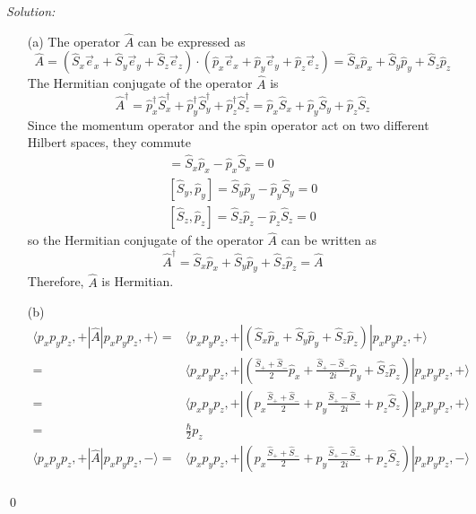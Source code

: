 \documentclass[10pt,a4paper]{article}
\newenvironment{sol}
    {\emph{Solution:}
    }
    {
    \qed
    }
\begin{document}
\begin{sol}
\begin{itemize}
\item[(a)] The operator $\hat{A}$ can be expressed as
\begin{equation}
\hat{A}=(\hat{S}_x\vec{e}_x+\hat{S}_y\vec{e}_y+\hat{S}_z\vec{e}_z)\cdot(\hat{p}_x\vec{e}_x+\hat{p}_y\vec{e}_y+\hat{p}_z\vec{e}_z)=\hat{S}_x\hat{p}_x+\hat{S}_y\hat{p}_y+\hat{S}_z\hat{p}_z
\end{equation}
The Hermitian conjugate of the operator $\hat{A}$ is
\begin{equation}
\hat{A}^{\dagger}=\hat{p}_x^{\dagger}\hat{S}_x^{\dagger}+\hat{p}_y^{\dagger}\hat{S}_y^{\dagger}+\hat{p}_z^{\dagger}\hat{S}_z^{\dagger}=\hat{p}_x\hat{S}_x+\hat{p}_y\hat{S}_y+\hat{p}_z\hat{S}_z
\end{equation}
Since the momentum operator and the spin operator act on two different Hilbert spaces, they commute
\begin{gather}
[\hat{S}_x,\hat{p}_x]=\hat{S}_x\hat{p}_x-\hat{p}_x\hat{S}_x=0\\
[\hat{S}_y,\hat{p}_y]=\hat{S}_y\hat{p}_y-\hat{p}_y\hat{S}_y=0\\
[\hat{S}_z,\hat{p}_z]=\hat{S}_z\hat{p}_z-\hat{p}_z\hat{S}_z=0
\end{gather}
so the Hermitian conjugate of the operator $\hat{A}$ can be written as
\begin{equation}
\hat{A}^{\dagger}=\hat{S}_x\hat{p}_x+\hat{S}_y\hat{p}_y+\hat{S}_z\hat{p}_z=\hat{A}
\end{equation}
Therefore, $\hat{A}$ is Hermitian.
\item[(b)] 
\begin{align}
\nonumber\langle p_xp_yp_z,+|\hat{A}|p_xp_yp_z,+\rangle=&\langle p_xp_yp_z,+|(\hat{S}_x\hat{p}_x+\hat{S}_y\hat{p}_y+\hat{S}_z\hat{p}_z)|p_xp_yp_z,+\rangle\\
\nonumber=&\langle p_xp_yp_z,+|(\frac{\hat{S}_++\hat{S}_-}{2}\hat{p}_x+\frac{\hat{S}_+-\hat{S}_-}{2i}\hat{p}_y+\hat{S}_z\hat{p}_z)|p_xp_yp_z,+\rangle\\
\nonumber=&\langle p_xp_yp_z,+|(p_x\frac{\hat{S}_++\hat{S}_-}{2}+p_y\frac{\hat{S}_+-\hat{S}_-}{2i}+p_z\hat{S}_z)|p_xp_yp_z,+\rangle\\
=&\frac{\hbar}{2}p_z
\end{align}
\begin{align}
\nonumber\langle p_xp_yp_z,+|\hat{A}|p_xp_yp_z,-\rangle=&\langle p_xp_yp_z,+|(p_x\frac{\hat{S}_++\hat{S}_-}{2}+p_y\frac{\hat{S}_+-\hat{S}_-}{2i}+p_z\hat{S}_z)|p_xp_yp_z,-\rangle\\

\end{align}
\end{itemize}
\end{sol}
\end{document}
